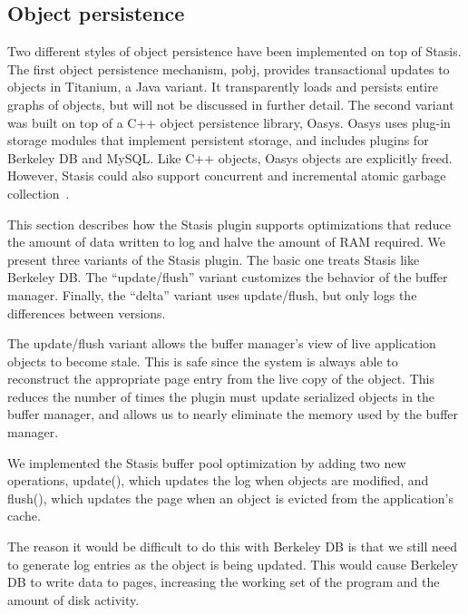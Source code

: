 \documentclass[letterpaper,twocolumn,10pt]{article}
\newcommand{\yad}{Stasis\xspace}
\newcommand{\yads}{Stasis'\xspace}
\newcommand{\oasys}{Oasys\xspace}
\begin{document}
\subsection{Object persistence}
\label{sec:oasys}

Two different styles of object persistence have been implemented
on top of \yad.
%
The first object persistence mechanism, pobj, provides transactional
updates to objects in Titanium, a Java variant.  It transparently
loads and persists entire graphs of objects, but will not be discussed
in further detail.  The second variant was built on top of a C++
object persistence library, \oasys.  \oasys uses plug-in storage
modules that implement persistent storage, and includes plugins for
Berkeley DB and MySQL.  Like C++ objects, \oasys objects are
explicitly freed.  However, \yad could also support 
concurrent and incremental atomic garbage collection~\cite{stableHeap}.

This section describes how the \yad plugin supports optimizations that reduce the
amount of data written to log and halve the amount of RAM required.
We present three variants of the \yad plugin.  The basic one treats
\yad like Berkeley DB.  The ``update/flush'' variant
customizes the behavior of the buffer manager. Finally, the 
``delta'' variant uses update/flush, but only logs the differences
between versions.

The update/flush variant allows the buffer manager's view of live
application objects to become stale.  This is safe since the system is
always able to reconstruct the appropriate page entry from the live
copy of the object.  This reduces the number of times the
plugin must update serialized objects in the buffer manager, and
allows us to nearly eliminate the memory used by the
buffer manager.  

We implemented the \yad buffer pool optimization by adding two new
operations, update(), which updates the log when objects are modified, and flush(), which
updates the page when an object is evicted from the application's cache.  

The reason it would be difficult to do this with Berkeley DB is that
we still need to generate log entries as the object is being updated.
  This would cause Berkeley DB to write data to pages,
increasing the working set of the program and the amount of disk activity.
\end{document}
